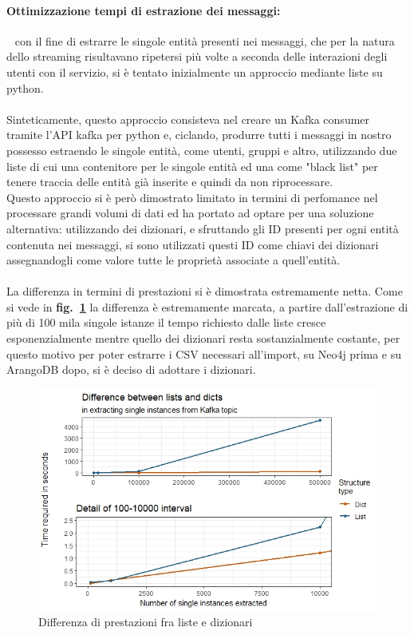 \documentclass[fleqn,10pt]{SelfArx} %
\begin{document}
{{\paragraph{Ottimizzazione tempi di estrazione dei messaggi:}  $~~$ con il fine di estrarre le singole entità presenti nei messaggi, che per la natura dello streaming risultavano ripetersi più volte a seconda delle interazioni degli utenti con il servizio, si è tentato inizialmente un approccio mediante liste su python. \\
\\Sinteticamente, questo approccio consisteva nel creare un Kafka consumer tramite l'API kafka per python e, ciclando, produrre tutti i messaggi in nostro possesso estraendo le singole entità, come utenti, gruppi e altro, utilizzando due liste di cui una contenitore per le singole entità ed una come "black list" per tenere traccia delle entità già inserite e quindi da non riprocessare. 
\\Questo approccio si è però dimostrato limitato in termini di perfomance nel processare grandi volumi di dati ed ha portato ad optare per una soluzione alternativa: utilizzando dei dizionari, e sfruttando gli ID presenti per ogni entità contenuta nei messaggi, si sono utilizzati questi ID come chiavi dei dizionari assegnandogli come valore tutte le proprietà associate a quell'entità. \\
\\La differenza in termini di prestazioni si è dimostrata estremamente netta. 
Come si vede in \textbf{fig.~\ref{plot_lists_dicts}} la differenza è estremamente marcata, a partire dall'estrazione di più di 100 mila singole istanze il tempo richiesto dalle liste cresce esponenzialmente mentre quello dei dizionari resta sostanzialmente costante, per questo motivo per poter estrarre i CSV necessari all'import, su Neo4j prima e su ArangoDB dopo, si è deciso di adottare i dizionari.
\begin{figure}
\centering
\includegraphics[scale=0.54]{viz_benchmark_lists_dicts.jpeg}
\caption{\footnotesize \label{plot_lists_dicts} Differenza di prestazioni fra liste e dizionari}
\end{figure}
}}
\end{document}
